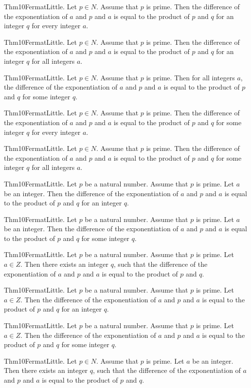 \documentclass{article}
\begin{document}
Thm10FermatLittle. Let $p \in N$. Assume that $p$ is prime. Then the difference of the exponentiation of $a$ and $p$ and $a$ is equal to the product of $p$ and $q$ for an integer $q$ for every integer $a$.

Thm10FermatLittle. Let $p \in N$. Assume that $p$ is prime. Then the difference of the exponentiation of $a$ and $p$ and $a$ is equal to the product of $p$ and $q$ for an integer $q$ for all integers $a$.

Thm10FermatLittle. Let $p \in N$. Assume that $p$ is prime. Then for all integers $a$, the difference of the exponentiation of $a$ and $p$ and $a$ is equal to the product of $p$ and $q$ for some integer $q$.

Thm10FermatLittle. Let $p \in N$. Assume that $p$ is prime. Then the difference of the exponentiation of $a$ and $p$ and $a$ is equal to the product of $p$ and $q$ for some integer $q$ for every integer $a$.

Thm10FermatLittle. Let $p \in N$. Assume that $p$ is prime. Then the difference of the exponentiation of $a$ and $p$ and $a$ is equal to the product of $p$ and $q$ for some integer $q$ for all integers $a$.

Thm10FermatLittle. Let $p$ be a natural number. Assume that $p$ is prime. Let $a$ be an integer. Then the difference of the exponentiation of $a$ and $p$ and $a$ is equal to the product of $p$ and $q$ for an integer $q$.

Thm10FermatLittle. Let $p$ be a natural number. Assume that $p$ is prime. Let $a$ be an integer. Then the difference of the exponentiation of $a$ and $p$ and $a$ is equal to the product of $p$ and $q$ for some integer $q$.

Thm10FermatLittle. Let $p$ be a natural number. Assume that $p$ is prime. Let $a \in Z$. Then there exists an integer $q$, such that the difference of the exponentiation of $a$ and $p$ and $a$ is equal to the product of $p$ and $q$.

Thm10FermatLittle. Let $p$ be a natural number. Assume that $p$ is prime. Let $a \in Z$. Then the difference of the exponentiation of $a$ and $p$ and $a$ is equal to the product of $p$ and $q$ for an integer $q$.

Thm10FermatLittle. Let $p$ be a natural number. Assume that $p$ is prime. Let $a \in Z$. Then the difference of the exponentiation of $a$ and $p$ and $a$ is equal to the product of $p$ and $q$ for some integer $q$.

Thm10FermatLittle. Let $p \in N$. Assume that $p$ is prime. Let $a$ be an integer. Then there exists an integer $q$, such that the difference of the exponentiation of $a$ and $p$ and $a$ is equal to the product of $p$ and $q$.
\end{document}
